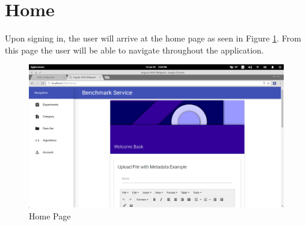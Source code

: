 \documentclass[11pt,a4paper]{article}
\begin{document}
\section{Home}
Upon signing in, the user will arrive at the home page as seen in Figure \ref{fig:homePage}. From this page the user will be able 
to navigate throughout the application.
\begin{figure}[H]
	\begin{center}
		\includegraphics[scale=0.3]{../Images/User Manual/Home Page.png}
		\caption{Home Page}
		\label{fig:homePage}
	\end{center}  
\end{figure}
\end{document}
